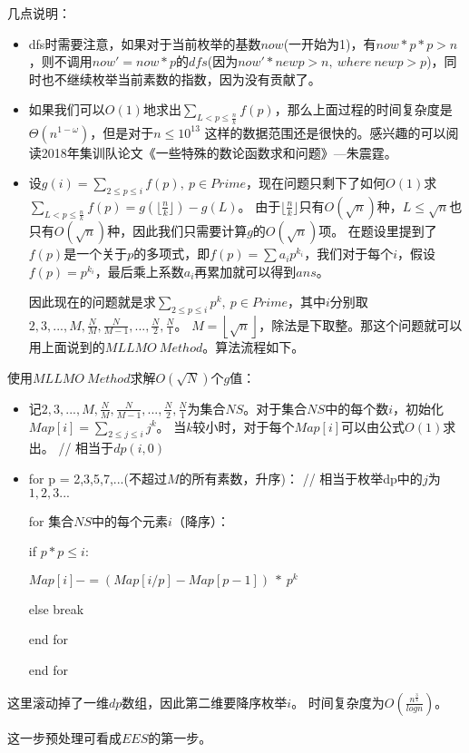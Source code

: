 \begin{solution}
{\heiti 几点说明：}
\begin{itemize}
	\item dfs时需要注意，如果对于当前枚举的基数$now$(一开始为1)，有$now*p*p>n$，则不调用$now' = now*p$的$dfs$(\quad 因为$now' * newp > n,\ where\ newp>p$\quad )，同时也不继续枚举当前素数的指数，因为没有贡献了。
	\item 如果我们可以$O(1)$地求出$\sum_{L<p\le \frac n k}f(p)$，那么上面过程的时间复杂度是$\Theta(n^{1-\omega})$，但是对于$n \leq 10^{13}$
	这样的数据范围还是很快的。感兴趣的可以阅读2018年集训队论文《一些特殊的数论函数求和问题》---朱震霆。
	\item 设$g(i)=\sum_{2\le p\le i}f(p),\ p\in Prime$，现在问题只剩下了如何$O(1)$求$\sum_{L<p\le \frac n k}f(p)=g(\lfloor \frac n k\rfloor)-g(L)$。
	由于$\lfloor \frac n k\rfloor$只有$O(\sqrt{n})$种，$L\le \sqrt{n}$也只有$O(\sqrt{n})$种，因此我们只需要计算$g$的$O(\sqrt{n})$项。
	在题设里提到了$f(p)$是一个关于$p$的多项式，即$f(p)=\sum a_ip^{k_i}$，我们对于每个$i$，假设$f(p)=p^{k_i}$，最后乘上系数$a_i$再累加就可以得到$ans$。
	
	{\heiti 因此现在的问题就是求$\sum_{2\le p\le i}p^{k},\ p\in Prime$，其中$i$分别取$2,3,...,M,\frac{N}{M},\frac{N}{M-1},...,\frac{N}{2},\frac{N}{1}$。
	$M=\left\lfloor \sqrt{n} \right\rfloor$，除法是下取整。}那这个问题就可以用上面说到的$MLLMO\ Method$。算法流程如下。
\end{itemize}
	
\vbox{}
	
{\heiti 使用$MLLMO\ Method$求解$O(\sqrt{N})$个$g$值：}

\begin{itemize}
	\item 记$2,3,...,M,\frac{N}{M},\frac{N}{M-1},...,\frac{N}{2},\frac{N}{1}$为集合$NS$。对于集合$NS$中的每个数$i$，初始化$Map[i] = \sum_{2\le j\le i}j^k$。
	当$k$较小时，对于每个$Map[i]$可以由公式$O(1)$求出。{\color{red} // 相当于$dp(i,0)$}
	\item for p = 2,3,5,7,...(不超过$M$的所有素数，升序)：{\color{red} // 相当于枚举dp中的$j$为$1,2,3...$}
	
	\quad \quad for 集合$NS$中的每个元素$i$（降序）：
	
	\quad \quad \quad \quad if $p*p\le i$:
	
	\quad \quad \quad \quad \quad \quad $Map[i]-=(Map[i/p] - Map[p-1])\ *\ p^k$
	
	\quad \quad \quad \quad else break
	
	\quad \quad end for
	
	end for
\end{itemize}

\begin{note}
	这里滚动掉了一维$dp$数组，因此第二维要降序枚举$i$。
	时间复杂度为$O(\frac {n^{\frac 3 4}}{ log n})$。
	
	这一步预处理可看成$EES$的第一步。
\end{note}
	
\vbox{}
	
\end{solution}

